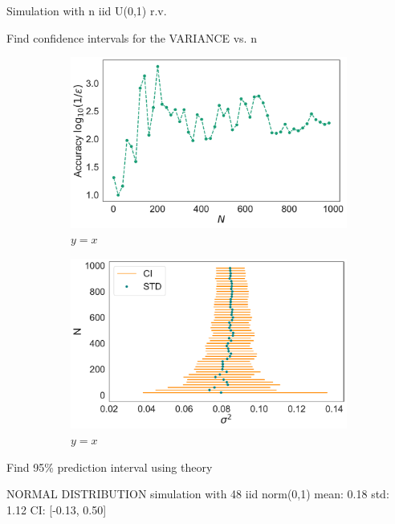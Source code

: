 \documentclass[twoside,onecolumn]{article}
\theoremstyle{definition}
\begin{document}
Simulation with n iid U(0,1) r.v.

Find confidence intervals for the VARIANCE vs. n
\begin{figure} \centering
\begin{subfigure}{0.45\textwidth}
         \includegraphics[width=\textwidth]{../figs/unif_mean_accuracy.pdf}
         \caption{$y=x$}\label{fig:y equals x}
     \end{subfigure}
     \begin{subfigure}{0.5\textwidth}
         \includegraphics[width=\textwidth]{../figs/unif_variance_CI.pdf}
         \caption{$y=x$}
         \label{fig:y equals x}
     \end{subfigure}
  \caption{}\label{fig:N_unif}
\end{figure}

Find 95\% prediction interval using theory


NORMAL DISTRIBUTION
simulation with 48 iid norm(0,1)
mean: 0.18
std: 1.12
CI: [-0.13, 0.50]
\end{document}
